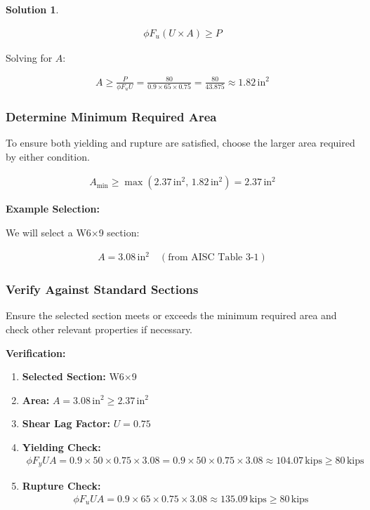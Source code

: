 \documentclass[12pt]{article}
\theoremstyle{definition} %
\newtheorem{solution}{Solution}
\theoremstyle{plain} %
\begin{document}
\begin{solution}
\begin{enumerate}
\begin{align}
\phi F_u (U \times A) \geq P \tag{10}
\end{align}

Solving for \( A \):

\begin{align}
A \geq \frac{P}{\phi F_u U} = \frac{80}{0.9 \times 65 \times 0.75} = \frac{80}{43.875} \approx 1.82 \, \text{in}^2 \tag{11}
\end{align}

\subsubsection*{Determine Minimum Required Area}

To ensure both yielding and rupture are satisfied, choose the larger area required by either condition.

\begin{align}
A_{\text{min}} \geq \max \left( 2.37 \, \text{in}^2, \, 1.82 \, \text{in}^2 \right) = 2.37 \, \text{in}^2 \tag{12}
\end{align}


\noindent\textbf{Example Selection:}

We will select a W6$\times$9 section:

\begin{align}
A = 3.08 \, \text{in}^2 \quad (\text{from AISC Table 3-1}) \tag{13}
\end{align}

\subsubsection*{Verify Against Standard Sections}

Ensure the selected section meets or exceeds the minimum required area and check other relevant properties if necessary.

\noindent\textbf{Verification:}

\begin{enumerate}
    \item \textbf{Selected Section:} W6$\times$9
    \item \textbf{Area:} \( A = 3.08 \, \text{in}^2 \geq 2.37 \, \text{in}^2 \)
    \item \textbf{Shear Lag Factor:} \( U = 0.75 \)
    \item \textbf{Yielding Check:}
    \begin{align}
    \phi F_y U A = 0.9 \times 50 \times 0.75 \times 3.08 = 0.9 \times 50 \times 0.75 \times 3.08 \approx 104.07 \, \text{kips} \geq 80 \, \text{kips}
    \end{align}
    \item \textbf{Rupture Check:}
    \begin{align}
    \phi F_u U A = 0.9 \times 65 \times 0.75 \times 3.08 \approx 135.09 \, \text{kips} \geq 80 \, \text{kips}
    \end{align}
\end{enumerate}


\end{enumerate}
\end{solution}
\end{document}
